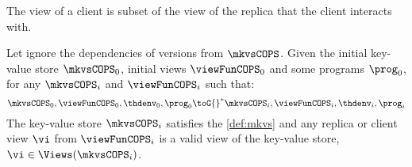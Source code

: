 
\begin{lemma}
    \label{lem:client-subset-repl}
    The view of a client is subset of the view of the replica that the client interacts with.
\end{lemma}


\begin{lemma}
    Let ignore the dependencies of versions from \( \mkvsCOPS \).
    Given the initial key-value store \( \mkvsCOPS_0 \), initial views \( \viewFunCOPS_0 \) and some programs \( \prog_0 \), for any \( \mkvsCOPS_i \) and \( \viewFunCOPS_i \)  such that: 
    \[
        \mkvsCOPS_0, \viewFunCOPS_0, \thdenv_0, \prog_0 {\toG{}}^* \mkvsCOPS_i, \viewFunCOPS_i, \thdenv_i, \prog_i
    \]
    The key-value store \( \mkvsCOPS_i \) satisfies the \cref{def:mkvs} and any replica or client view \( \vi \) from \( \viewFunCOPS_i \) is a valid view of the key-value store, \ie \( \vi \in \Views(\mkvsCOPS_i) \).
\end{lemma}
